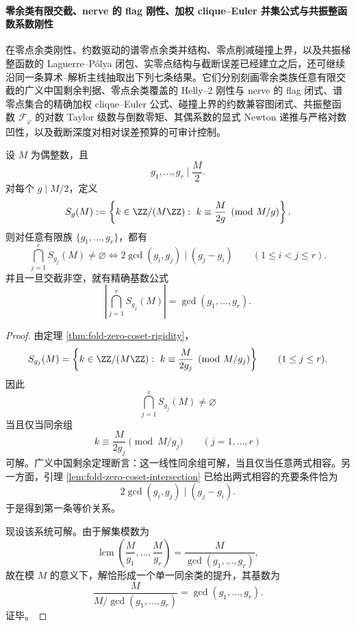 \paragraph{零余类有限交截、nerve 的 flag 刚性、加权 clique--Euler 并集公式与共振整函数系数刚性}
在零点余类刚性、约数驱动的谱零点余类并结构、零点削减碰撞上界，以及共振梯整函数的 Laguerre--P\'olya 闭包、实零点结构与截断误差已经建立之后，还可继续沿同一条算术--解析主线抽取出下列七条结果。它们分别刻画零余类族任意有限交截的广义中国剩余判据、零点余类覆盖的 Helly--2 刚性与 nerve 的 flag 闭式、谱零点集合的精确加权 clique--Euler 公式、碰撞上界的约数兼容图闭式、共振整函数 \(\mathcal F_\varphi\) 的对数 Taylor 级数与倒数零矩、其偶系数的显式 Newton 递推与严格对数凹性，以及截断深度对相对误差预算的可审计控制。

\begin{theorem}[零余类族的任意有限交截由两两兼容性完全控制]\label{thm:xi-time-part71-zero-coset-finite-intersection-pairwise-compatibility}
设 \(M\) 为偶整数，且
\[
g_1,\dots,g_r\mid \frac{M}{2}.
\]
对每个 \(g\mid M/2\)，定义
\[
S_g(M):=
\left\{
k\in \ZZ/(M\ZZ):
\ k\equiv \frac{M}{2g}\pmod{M/g}
\right\}.
\]
则对任意有限族 \(\{g_1,\dots,g_r\}\)，都有
\[
\bigcap_{j=1}^{r}S_{g_j}(M)\neq\varnothing
\iff
2\gcd(g_i,g_j)\mid (g_j-g_i)
\qquad
(1\le i<j\le r).
\]
并且一旦交截非空，就有精确基数公式
\[
\left|
\bigcap_{j=1}^{r}S_{g_j}(M)
\right|
=
\gcd(g_1,\dots,g_r).
\]
\end{theorem}
\begin{proof}
由定理 \ref{thm:fold-zero-coset-rigidity}，
\[
S_{g_j}(M)
=
\left\{
k\in \ZZ/(M\ZZ):
\ k\equiv \frac{M}{2g_j}\pmod{M/g_j}
\right\}
\qquad (1\le j\le r).
\]
因此
\[
\bigcap_{j=1}^{r}S_{g_j}(M)\neq\varnothing
\]
当且仅当同余组
\[
k\equiv \frac{M}{2g_j}\pmod{M/g_j}
\qquad (j=1,\dots,r)
\]
可解。广义中国剩余定理断言：这一线性同余组可解，当且仅当任意两式相容。另一方面，引理 \ref{lem:fold-zero-coset-intersection} 已给出两式相容的充要条件恰为
\[
2\gcd(g_i,g_j)\mid (g_j-g_i).
\]
于是得到第一条等价关系。

现设该系统可解。由于解集模数为
\[
\operatorname{lcm}\!\left(\frac{M}{g_1},\dots,\frac{M}{g_r}\right)
=
\frac{M}{\gcd(g_1,\dots,g_r)},
\]
故在模 \(M\) 的意义下，解恰形成一个单一同余类的提升，其基数为
\[
\frac{M}{M/\gcd(g_1,\dots,g_r)}
=
\gcd(g_1,\dots,g_r).
\]
证毕。
\end{proof}



